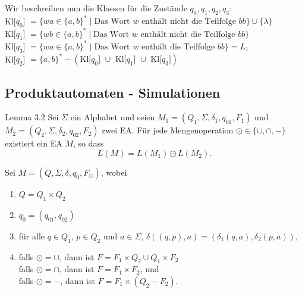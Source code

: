 
Wir beschreiben nun die Klassen für die Zustände $q_0, q_1, q_2, q_3$:
\\Kl[$q_0$] $= \{wa \in \{a,b\}^* \mid \text{Das Wort }w \text{ enthält nicht die Teilfolge } bb\} \cup \{\lambda\}$
\\Kl[$q_1$] $= \{wb \in \{a,b\}^* \mid \text{Das Wort } w \text{ enthält nicht die Teilfolge } bb\}$
\\Kl[$q_3$] $= \{wa \in \{a,b\}^* \mid \text{Das Wort } w \text{ enthält die Teilfolge } bb\} = L_1$
\\Kl[$q_2$] $= \{a,b\}^* - (\text{Kl[$q_0$] $\cup $ Kl[$q_1$] $\cup $ Kl[$q_3$]})$



\subsection{Produktautomaten - Simulationen}
\begin{mainbox}{Lemma 3.2}
    Sei $\Sigma$ ein Alphabet und seien $M_1 = (Q_1, \Sigma, \delta_1, q_{01}, F_1)$ und $M_2 = (Q_2, \Sigma, \delta_2, q_{02}, F_2)$ zwei EA. Für jede Mengenoperation $\odot \in \{\cup, \cap, -\}$ existiert ein EA $M$, so dass
    $$L(M) = L(M_1) \odot L(M_2).$$
\end{mainbox}
Sei $M = (Q, \Sigma, \delta, q_0, F_{\odot})$, wobei
\begin{enumerate}[label=(\roman*)]
    \item $Q = Q_1 \times Q_2$
    \item $q_0 = (q_{01}, q_{02})$
    \item für alle $q \in Q_1$, $p \in Q_2$ und $a \in \Sigma$, $\delta((q,p), a) = (\delta_1(q,a), \delta_2(p, a))$,
    \item falls $\odot = \cup$, dann ist $F = F_1 \times Q_2 \cup Q_1 \times F_2$\\
    falls $\odot = \cap$, dann ist $F = F_1 \times F_2$, und\\
    falls $\odot = -$, dann ist $F = F_1 \times (Q_2 - F_2)$.
\end{enumerate}



